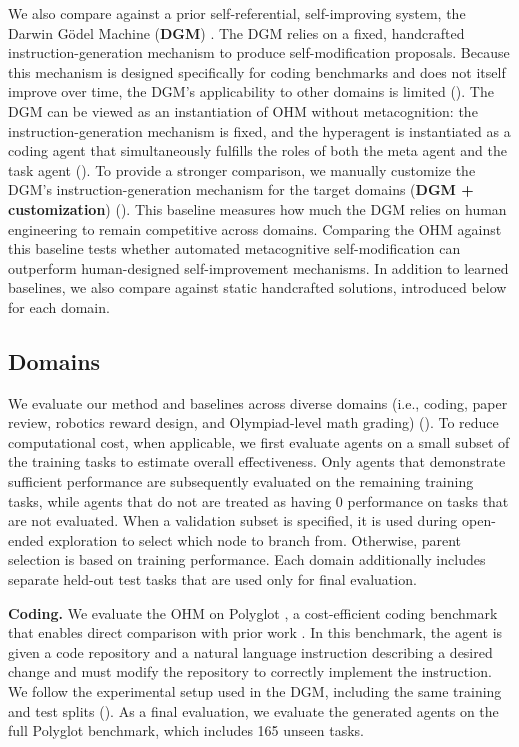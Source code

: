 \documentclass[]{fairmeta}
\begin{document}
We also compare against a prior self-referential, self-improving system, the Darwin G\"odel Machine (\textbf{DGM}) \citep{zhang2025darwin}. The DGM relies on a fixed, handcrafted instruction-generation mechanism to produce self-modification proposals. Because this mechanism is designed specifically for coding benchmarks and does not itself improve over time, the DGM's applicability to other domains is limited (). The DGM can be viewed as an instantiation of OHM without metacognition: the instruction-generation mechanism is fixed, and the hyperagent is instantiated as a coding agent that simultaneously fulfills the roles of both the meta agent and the task agent ().
To provide a stronger comparison, we manually customize the DGM's instruction-generation mechanism for the target domains (\textbf{DGM + customization}) (). This baseline measures how much the DGM relies on human engineering to remain competitive across domains. Comparing the OHM against this baseline tests whether automated metacognitive self-modification can outperform human-designed self-improvement mechanisms.
In addition to learned baselines, we also compare against static handcrafted solutions, introduced below for each domain.


\subsection{Domains}
\label{sec:domains}

We evaluate our method and baselines across diverse domains (i.e., coding, paper review, robotics reward design, and Olympiad-level math grading) (). To reduce computational cost, when applicable, we first evaluate agents on a small subset of the training tasks to estimate overall effectiveness. Only agents that demonstrate sufficient performance are subsequently evaluated on the remaining training tasks, while agents that do not are treated as having 0 performance on tasks that are not evaluated. When a validation subset is specified, it is used during open-ended exploration to select which node to branch from. Otherwise, parent selection is based on training performance. Each domain additionally includes separate held-out test tasks that are used only for final evaluation.

\textbf{Coding.}
We evaluate the OHM on Polyglot \citep{gauthier2024polyglot}, a cost-efficient coding benchmark that enables direct comparison with prior work \citep{zhang2025darwin}. In this benchmark, the agent is given a code repository and a natural language instruction describing a desired change and must modify the repository to correctly implement the instruction. We follow the experimental setup used in the DGM, including the same training and test splits (). As a final evaluation, we evaluate the generated agents on the full Polyglot benchmark, which includes 165 unseen tasks.
\end{document}
